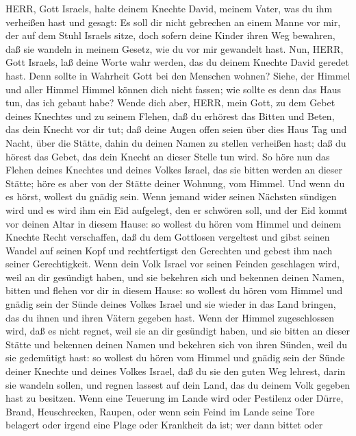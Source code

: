 HERR, Gott Israels, halte deinem Knechte David, meinem Vater, was du ihm
verheißen hast und gesagt: Es soll dir nicht gebrechen an einem Manne
vor mir, der auf dem Stuhl Israels sitze, doch sofern deine Kinder ihren
Weg bewahren, daß sie wandeln in meinem Gesetz, wie du vor mir gewandelt
hast.  Nun, HERR, Gott Israels, laß deine Worte wahr
werden, das du deinem Knechte David geredet hast.  Denn
sollte in Wahrheit Gott bei den Menschen wohnen? Siehe, der Himmel und
aller Himmel Himmel können dich nicht fassen; wie sollte es denn das
Haus tun, das ich gebaut habe?  Wende dich aber, HERR, mein
Gott, zu dem Gebet deines Knechtes und zu seinem Flehen, daß du erhörest
das Bitten und Beten, das dein Knecht vor dir tut;  daß
deine Augen offen seien über dies Haus Tag und Nacht, über die Stätte,
dahin du deinen Namen zu stellen verheißen hast; daß du hörest das
Gebet, das dein Knecht an dieser Stelle tun wird.  So höre
nun das Flehen deines Knechtes und deines Volkes Israel, das sie bitten
werden an dieser Stätte; höre es aber von der Stätte deiner Wohnung, vom
Himmel. Und wenn du es hörst, wollest du gnädig sein.  Wenn
jemand wider seinen Nächsten sündigen wird und es wird ihm ein Eid
aufgelegt, den er schwören soll, und der Eid kommt vor deinen Altar in
diesem Hause:  so wollest du hören vom Himmel und deinem
Knechte Recht verschaffen, daß du dem Gottlosen vergeltest und gibst
seinen Wandel auf seinen Kopf und rechtfertigst den Gerechten und gebest
ihm nach seiner Gerechtigkeit.  Wenn dein Volk Israel vor
seinen Feinden geschlagen wird, weil an dir gesündigt haben, und sie
bekehren sich und bekennen deinen Namen, bitten und flehen vor dir in
diesem Hause:  so wollest du hören vom Himmel und gnädig
sein der Sünde deines Volkes Israel und sie wieder in das Land bringen,
das du ihnen und ihren Vätern gegeben hast.  Wenn der
Himmel zugeschlossen wird, daß es nicht regnet, weil sie an dir
gesündigt haben, und sie bitten an dieser Stätte und bekennen deinen
Namen und bekehren sich von ihren Sünden, weil du sie gedemütigt hast:
 so wollest du hören vom Himmel und gnädig sein der Sünde
deiner Knechte und deines Volkes Israel, daß du sie den guten Weg
lehrest, darin sie wandeln sollen, und regnen lassest auf dein Land, das
du deinem Volk gegeben hast zu besitzen.  Wenn eine
Teuerung im Lande wird oder Pestilenz oder Dürre, Brand, Heuschrecken,
Raupen, oder wenn sein Feind im Lande seine Tore belagert oder irgend
eine Plage oder Krankheit da ist;  wer dann bittet oder
